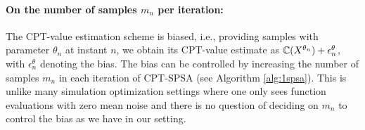 
\paragraph{On the number of samples $m_n$ per iteration:}
The CPT-value estimation scheme is biased, i.e., providing samples with parameter $\theta_n$ at instant $n$, we obtain its CPT-value estimate as $\mathbb{C}(X^{\theta_n}) + \epsilon_n^\theta$, with $\epsilon_n^\theta$ denoting the bias. The bias can be controlled by increasing the number of samples $m_n$ in each iteration of CPT-SPSA (see Algorithm \ref{alg:1spsa}). This is unlike many simulation optimization settings where one only sees function evaluations with zero mean noise and there is no question of deciding on $m_n$ to control the bias as we have in our setting.

